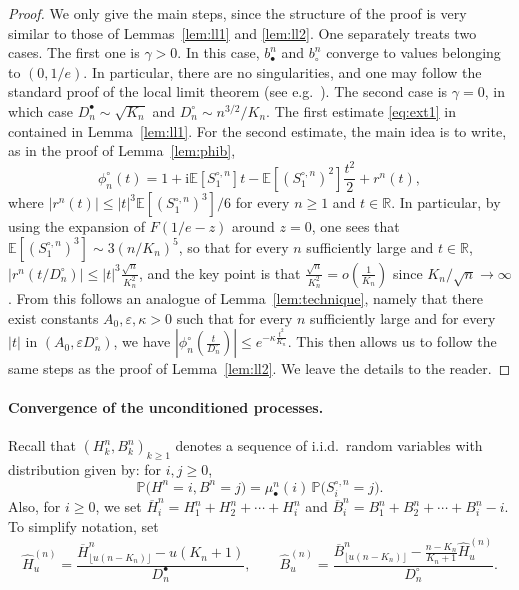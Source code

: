 \documentclass[AHL,XML,longabstracts,Unicode]{cedram}
\newcommand{\E}{\mathbb{E}}
\newcommand{\R}{\mathbb{R}}
\def\bbn{b_{\bullet}^{n}}
\def\bcn{b_{\circ}^{n}}
\def\mubn{\mu_{\bullet}^{n}}
\def\Scn{S^{\circ,n}}
\def\phicn{\phi^{\circ}_{n}}
\def\Dbn{D^{\bullet}_{n}}
\def\Dcn{D^{\circ}_{n}}
\def\oB{\overline{B}}
\def\hB{\widehat{B}}
\def\oH{\overline{H}}
\def\hH{\widehat{H}}
\renewcommand{\epsilon}{\varepsilon}
\newcommand\Prb[1]{\mathbb{P}\big(#1\big)}
\begin{document}
\begin{proof}
  We only give the main steps, since the structure of the proof is very similar to those of Lemmas~\ref{lem:ll1} and \ref{lem:ll2}. One separately treats two cases. The first one is $\gamma>0$. In this case, $\bbn$ and $\bcn$ converge to values belonging to $(0,1/e)$. In particular, there are no singularities, and one may follow the standard proof of the local limit theorem (see e.g.~\cite[Theorem 3.5.2]{Dur10}). The second case is $\gamma=0$, in which case  $ \Dbn \sim \sqrt{K_{n}}$ and $\Dcn \sim n^{3/2} /K_{n}$. The first estimate \eqref{eq:ext1} in contained in Lemma~\ref{lem:ll1}. For the second estimate, the main idea is to write, as in the proof of Lemma~\ref{lem:phib},
\[\phicn(t)=1+\textrm{i}\E[\Scn_{1}]t- \E[(\Scn_{1})^{2}] \frac{t^{2}}{2}+r^{n}(t),\]
where $|r^{n}(t)| \leq |t|^{3}  \E[(\Scn_{1})^{3}]/6$ for every $n \geq 1$ and $t \in \R$. In particular, by using the expansion of $F(1/e-z)$ around $z=0$, one sees that $ \E[(\Scn_{1})^{3}] \sim 3 (n/K_{n})^{5}$, so that for every $n$ sufficiently large and $t \in \R$, $|r^{n}(t/\Dcn)| \leq |t|^{3} \tfrac{\sqrt{n}}{K_{n}^{2}}$, and the key point is that $ \tfrac{\sqrt{n}}{K_{n}^{2}}= o(\tfrac{1}{K_{n}})$ since $K_{n}/\sqrt{n} \rightarrow \infty$. From this follows an analogue of Lemma~\ref{lem:technique}, namely that there exist constants $A_{0},\epsilon,\kappa>0$ such that  for every $n$ sufficiently large and for every $|t|$ in $(A_{0}, \epsilon \Dcn)$, we have $|\phicn( \tfrac{t}{\Dcn})| \leq e^{- \kappa  \frac{t^{2}}{K_{n}}}$. This then allows us to follow the same steps as the proof of Lemma~\ref{lem:ll2}. We leave the details to the reader.
\end{proof}



\paragraph*{Convergence of the unconditioned processes.}  Recall that $(H^{n}_{k},B^{n}_{k})_{k \geq 1}$ denotes a sequence of i.i.d.~random variables with distribution given by: for $i, j \geq 0$,
\[ \Prb{H^{n}=i,B^{n}=j}=\mubn(i) \,\Prb{\Scn_{i}=j}.\]
Also, for $i \geq 0$, we set  $\oH^{n}_{i}=H^{n}_{1}+H^{n}_{2}+ \cdots+H^{n}_{i}$ and  $\oB^{n}_{i}=B^{n}_{1}+B^{n}_{2}+ \cdots+B^{n}_{i}-i$.
To simplify notation, set \[\hH^{(n)}_{u}=\frac{\oH^{n}_{ \lfloor u (n-K_{n}) \rfloor } - u (K_{n}+1) }{\Dbn}, \qquad \hB^{(n)}_{u}= \frac{\oB^{n}_{ \lfloor u (n-K_{n}) \rfloor }  - \frac{n-K_{n}}{K_{n}+1} \hH^{(n)}_{u}  }{\Dcn}.\]
\end{document}
